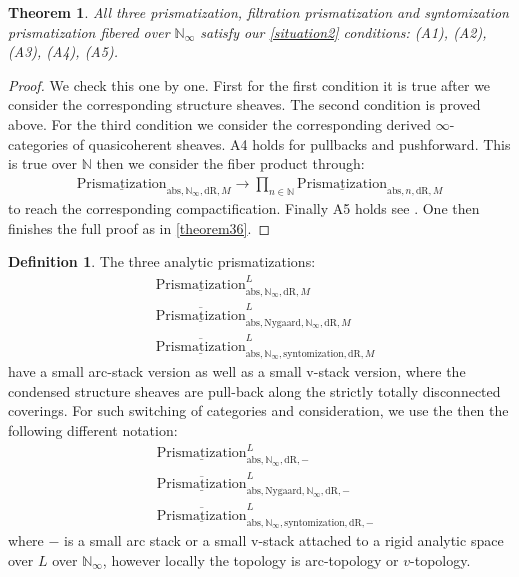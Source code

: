 \documentclass[12pt]{article}
\newtheorem{theorem}{Theorem}
\theoremstyle{definition}
\newtheorem{definition}{Definition}
\begin{document}
\begin{theorem}
All three prismatization, filtration prismatization and syntomization prismatization fibered over $\mathbb{N}_\infty$ satisfy our \cref{situation2} conditions: (A1), (A2), (A3), (A4), (A5).
\end{theorem}


\begin{proof}
We check this one by one. First for the first condition it is true after we consider the corresponding structure sheaves. The second condition is proved above. For the third condition we consider the corresponding derived $\infty$-categories of quasicoherent sheaves. A4 holds for pullbacks and pushforward. This is true over $\mathbb{N}$ then we consider the fiber product through:
\begin{align}
{\underline{\mathrm{Prismatization}}}_{\mathrm{abs},\mathbb{N}_\infty,\mathrm{dR},M}\rightarrow  \prod_{n\in \mathbb{N}} {\underline{\mathrm{Prismatization}}}_{\mathrm{abs},n,\mathrm{dR},M}
\end{align}
to reach the corresponding compactification. Finally A5 holds see \cite[Chapter 4, in particular 4.7, 4.8, 4.9, 4.10]{3A}. One then finishes the full proof as in \cref{theorem36}.
\end{proof}

\begin{definition}
The three analytic prismatizations:
\begin{align}
&\underline{\mathrm{Prismatization}}^L_{\mathrm{abs},\mathbb{N}_\infty,\mathrm{dR},M}\\
&\overline{\underline{\mathrm{Prismatization}}}^L_{\mathrm{abs},\mathrm{Nygaard},\mathbb{N}_\infty,\mathrm{dR},M}\\
&\overline{\underline{\mathrm{Prismatization}}}^L_{\mathrm{abs},\mathbb{N}_\infty,\mathrm{syntomization},\mathrm{dR},M}
\end{align}
have a small arc-stack version as well as a small v-stack version, where the condensed structure sheaves are pull-back along the strictly totally disconnected coverings. For such switching of categories and consideration, we use the then the following different notation:
\begin{align}
&\underline{\mathrm{Prismatization}}^L_{\mathrm{abs},\mathbb{N}_\infty,\mathrm{dR},-}\\
&\overline{\underline{\mathrm{Prismatization}}}^L_{\mathrm{abs},\mathrm{Nygaard},\mathbb{N}_\infty,\mathrm{dR},-}\\
&\overline{\underline{\mathrm{Prismatization}}}^L_{\mathrm{abs},\mathbb{N}_\infty,\mathrm{syntomization},\mathrm{dR},-}
\end{align}
where $-$ is a small arc stack or a small v-stack attached to a rigid analytic space over $L$ over $\mathbb{N}_\infty$, however locally the topology is arc-topology or $v$-topology.
\end{definition}
\end{document}
